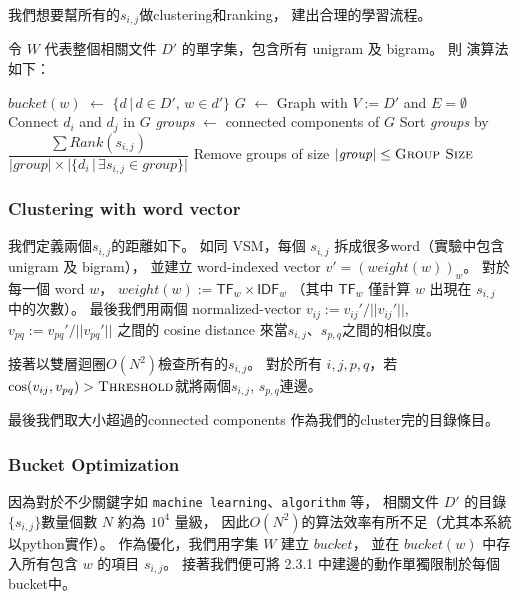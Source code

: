 我們想要幫所有的$s_{i,j}$做clustering和ranking，
建出合理的學習流程。

令 $W$ 代表整個相關文件 $D'$ 的單字集，包含所有 unigram 及 bigram。
則  演算法如下：

\begin{algorithmic}
      \State $\mathit{bucket}(w)$ $\gets$ $\{d\,|\,d\in D',\,w\in d'\}$
    \EndFor
    \State $G$ $\gets$ Graph with $V:=D'$ and $E=\emptyset$
        \State Connect $d_i$ and $d_j$ in $G$
      \EndFor
    \EndFor
    \State \textit{groups} $\gets$ connected components of $G$
    \State
    \State Sort \textit{groups} by $\dfrac{\sum \mathit{Rank}(s_{i,j})}{|\mathit{group}|\times |\{d_i \,|\, \exists s_{i,j} \in group\}|}$
    \State
    \State Remove groups of size $|\mathit{group}|\le\text{\textproc{Group Size}}$
  \EndFunction
\end{algorithmic}


\subsubsection{Clustering with word vector}

我們定義兩個$s_{i,j}$的距離如下。
如同 VSM，每個 $s_{i,j}$ 拆成很多word（實驗中包含 unigram 及 bigram），
並建立 word-indexed vector $v' = (\mathit{weight}(w))_w$。
對於每一個 word $w$， $\mathit{weight}(w):=\mathsf{TF}_w\times\mathsf{IDF}_w$
（其中 $\mathsf{TF}_w$ 僅計算 $w$ 出現在 $s_{i,j}$ 中的次數）。
最後我們用兩個 normalized-vector $v_{ij}:=v_{ij}'/||v_{ij}'||$, $v_{pq}:=v_{pq}'/||v_{pq}'||$ 之間的 cosine distance 來當$s_{i,j}$、$s_{p,q}$之間的相似度。

接著以雙層迴圈$O(N^{2})$檢查所有的$s_{i,j}$。
對於所有 $i,j,p,q$，若 $\cos(v_{ij},v_{pq}) > \text{\textproc{Threshold}}$就將兩個$s_{i,j}$, $s_{p,q}$連邊。

最後我們取大小超過的connected components
作為我們的cluster完的目錄條目。

\subsubsection{Bucket Optimization}
因為對於不少關鍵字如 \texttt{machine learning}、\texttt{algorithm} 等，
相關文件 $D'$ 的目錄 $\{s_{i,j}\}$數量個數 $N$ 約為 $10^4$ 量級，
因此$O(N^{2})$的算法效率有所不足（尤其本系統以python實作）。
作為優化，我們用字集 $W$ 建立 $\mathit{bucket}$，
並在 $bucket(w)$ 中存入所有包含 $w$ 的項目 $s_{i,j}$。
接著我們便可將 2.3.1 中建邊的動作單獨限制於每個bucket中。


